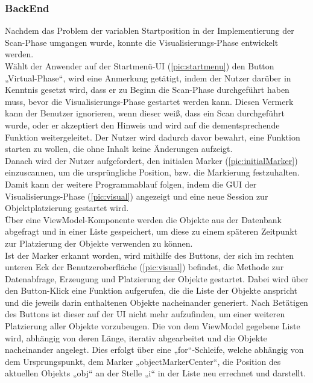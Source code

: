 \subsubsection{BackEnd}
Nachdem das Problem der variablen Startposition in der Implementierung der Scan-Phase umgangen wurde, konnte die Visualisierungs-Phase entwickelt werden. 
\\ 
\linebreak
Wählt der Anwender auf der Startmenü-\acs{UI} (\ref{pic:startmenu}) den Button „Virtual-Phase“, wird eine Anmerkung getätigt, indem der Nutzer darüber in 
Kenntnis gesetzt wird, dass er zu Beginn die Scan-Phase durchgeführt haben muss, bevor die Visualisierungs-Phase gestartet werden kann. Diesen Vermerk kann der 
Benutzer ignorieren, wenn dieser weiß, dass ein Scan durchgeführt wurde, oder er akzeptiert den Hinweis und wird auf die dementsprechende Funktion weitergeleitet. 
Der Nutzer wird dadurch davor bewahrt, eine Funktion starten zu wollen, die ohne Inhalt keine Änderungen aufzeigt.
\\ 
Danach wird der Nutzer aufgefordert, den initialen Marker (\ref{pic:initialMarker}) einzuscannen, um die ursprüngliche Position, bzw. die Markierung festzuhalten. 
Damit kann der weitere Programmablauf folgen, indem die \acs{GUI} der Visualisierungs-Phase (\ref{pic:visual}) angezeigt und eine neue Session zur 
Objektplatzierung gestartet wird. 
\\
Über eine ViewModel-Komponente werden die Objekte aus der Datenbank abgefragt und in einer Liste gespeichert, um diese zu einem späteren Zeitpunkt zur Platzierung der 
Objekte verwenden zu können.
\\
Ist der Marker erkannt worden, wird mithilfe des Buttons, der sich im rechten unteren Eck der Benutzeroberfläche (\ref{pic:visual}) befindet, die Methode zur 
Datenabfrage, Erzeugung und Platzierung der Objekte gestartet. Dabei wird über den Button-Klick eine Funktion aufgerufen, die die Liste der Objekte anspricht und 
die jeweils darin enthaltenen Objekte nacheinander generiert. Nach Betätigen des Buttons ist dieser auf der \acs{UI} nicht mehr aufzufinden, um einer weiteren 
Platzierung aller Objekte vorzubeugen. Die von dem ViewModel gegebene Liste wird, abhängig von deren Länge, iterativ abgearbeitet und die Objekte 
nacheinander angelegt. Dies erfolgt über eine „for“-Schleife, welche abhängig von dem Ursprungspunkt, dem Marker „objectMarkerCenter“, die Position des 
aktuellen Objekts „obj“ an der Stelle „i“ in der Liste neu errechnet und darstellt.
\\ 
